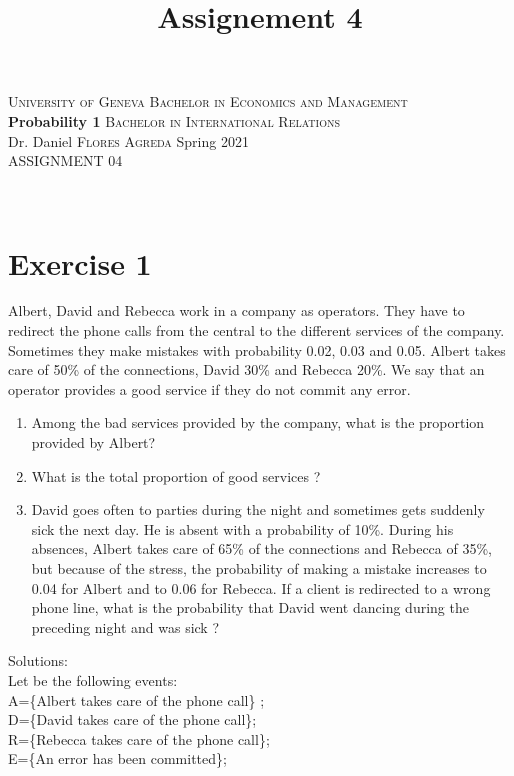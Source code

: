 \documentclass[12pt,thmsa]{article}\usepackage[]{graphicx}\usepackage[]{color}
\title{Assignement 4}
\begin{document}
\noindent \textsc{University of Geneva}     \hfill \textsc{Bachelor in Economics and Management} \\
\textbf{Probability 1}                      \hfill \textsc{Bachelor in International Relations} \\
Dr. Daniel \textsc{Flores Agreda}                 \hfill Spring 2021  \\
ASSIGNMENT 04



\noindent
\makebox[\linewidth]{\rule{\textwidth}{0.4pt}}\\[1.5ex]

\section*{Exercise 1}

Albert, David and Rebecca work in a company as operators. They have to redirect the phone calls from the central to the different services of the company. Sometimes they make mistakes with
probability 0.02, 0.03 and 0.05. Albert takes care of 50\% of the connections, David 30\% and Rebecca 20\%. We say that an operator provides a good service if they do not commit any error.

\begin{enumerate}
  \item Among the bad services provided by the company, what is the proportion provided by Albert?
  \item What is the total proportion of good services ?
  \item
  David goes often to parties during the night and sometimes gets suddenly sick the next day. He is absent with a probability of 10\%.
  During his absences, Albert takes care of 65\% of the connections and Rebecca of 35\%, but because of the stress, the probability of making a mistake
  increases to 0.04 for Albert and to 0.06 for Rebecca. If a client is redirected to a wrong phone line, what is the probability that David went dancing during the preceding night and was sick ?
\end{enumerate}

\noindent Solutions:\\
Let be the following events: \\
A=\{Albert takes care of the phone call\} ; \\
D=\{David takes care of the phone call\}; \\
R=\{Rebecca takes care of the phone call\}; \\
E=\{An error has been committed\}; \\
\end{document}
